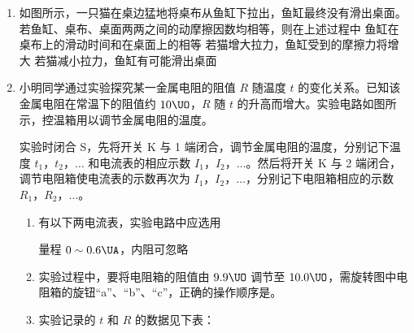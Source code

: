 \documentclass[\gkver]{gaokaozhenti}
\begin{document}
\begin{enumerate}
\item
如图所示，一只猫在桌边猛地将桌布从鱼缸下拉出，鱼缸最终没有滑出桌面。若鱼缸、桌布、桌面两两之间的动摩擦因数均相等，则在上述过程中
{鱼缸在桌布上的滑动时间和在桌面上的相等}
{若猫增大拉力，鱼缸受到的摩擦力将增大}
{若猫减小拉力，鱼缸有可能滑出桌面}

\item
小明同学通过实验探究某一金属电阻的阻值 $R$ 随温度 $t$ 的变化关系。已知该金属电阻在常温下的阻值约 $10\UO$，$R$ 随 $t$ 的升高而增大。实验电路如图所示，控温箱用以调节金属电阻的温度。

实验时闭合 S，先将开关 K 与 1 端闭合，调节金属电阻的温度，分别记下温度 $t_{1}$，$t_{2}$，$\ldots$ 和电流表的相应示数 $I_{1}$，$I_{2}$，$\ldots$。然后将开关 K 与 2 端闭合，调节电阻箱使电流表的示数再次为 $I_{1}$，$I_{2}$，$\ldots$，分别记下电阻箱相应的示数 $R_{1}$，$R_{2}$，$\ldots$。


\begin{enumerate}
	\item
	有以下两电流表，实验电路中应选用

	{量程 $0\sim0.6\UA$，内阻可忽略}
	\item
	实验过程中，要将电阻箱的阻值由 $9.9\UO$ 调节至 $10.0\UO$，需旋转图中电阻箱的旋钮“a”、“b”、“c”，正确的操作顺序是。

	\item
	实验记录的 $t$ 和 $R$ 的数据见下表：


\end{enumerate}
\end{enumerate}
\end{document}
